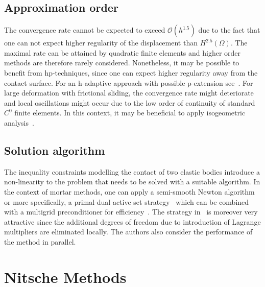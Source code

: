 \documentclass[12pt]{article}
\begin{document}
\subsection{Approximation order}
The convergence rate cannot be expected to exceed $\mathcal{O}(h^{1.5})$ due to the fact that one can not expect higher regularity of the displacement than $H^{2.5}(\Omega)$. 
The maximal rate can be attained by quadratic finite elements and higher order methods are therefore rarely considered. Nonetheless, it may be possible to benefit from hp-techniques, since one can expect higher regularity away from the contact surface.
For an h-adaptive approach with possible p-extension see~\cite{rachowicz2017h}.
For large deformation with frictional sliding, the convergence rate might deteriorate and local oscillations might occur due to the low order of continuity of standard $C^0$ finite elements.
In this context, it may be beneficial to apply isogeometric analysis~\cite{de2011large,brivadis2015isogeometric}.

\subsection{Solution algorithm}
The inequality constraints modelling the contact of two elastic bodies introduce a non-linearity to the problem that needs to be solved with a suitable algorithm.
In the context of mortar methods, one can apply a semi-smooth Newton algorithm or more specifically, a primal-dual active set strategy~\cite{hintermuller2002primal} which can be combined with a multigrid preconditioner for efficiency~\cite{hueber2005primal,wiesner2018algebraic}.
The strategy in~\cite{wiesner2018algebraic} is moreover very attractive since the additional degrees of freedom due to introduction of Lagrange multipliers are eliminated locally. The authors also consider the performance of the method in parallel.

\section{Nitsche Methods}


\end{document}
